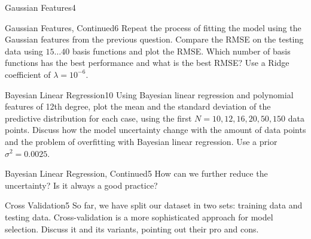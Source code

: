\begin{questions}
\begin{question}{Gaussian Features}{4}
\begin{answer}\end{answer}

\end{question}


\begin{question}{Gaussian Features, Continued}{6}
Repeat the process of fitting the model using the Gaussian features from the previous question. Compare the RMSE on the testing data using $15 \ldots 40$ basis functions and plot the RMSE. Which number of basis functions has the best performance and what is the best RMSE? Use a Ridge coefficient of $\lambda=10^{-6}$.

\begin{answer}\end{answer}

\end{question}


\begin{question}{Bayesian Linear Regression}{10}
Using Bayesian linear regression and polynomial features of 12th degree, plot the mean and the standard deviation of the predictive distribution for each case, using the first $N={10, 12, 16, 20, 50, 150}$ data points.
Discuss how the model uncertainty change with the amount of data points and the problem of overfitting with Bayesian linear regression. Use a prior $\sigma^2=0.0025$.

\begin{answer}\end{answer}
\end{question}


\begin{question}{Bayesian Linear Regression, Continued}{5}
How can we further reduce the uncertainty? Is it always a good practice?

\begin{answer}\end{answer}
\end{question}


\begin{question}[bonus]{Cross Validation}{5}
So far, we have split our dataset in two sets: training data and testing data. Cross-validation is a more sophisticated approach for model selection. Discuss it and its variants, pointing out their pro and cons.
\end{question}

\begin{answer}\end{answer}

\end{questions}
